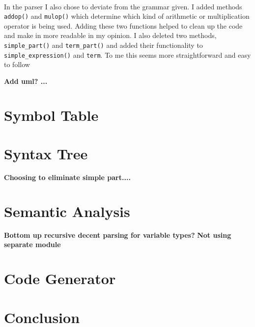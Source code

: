 \documentclass[10]{article}
\begin{document}
\paragraph{}
In the parser I also chose to deviate from the grammar given. I added methods \verb|addop()| and \verb|mulop()| which determine which kind of arithmetic or multiplication operator is being used. Adding these two functions helped to clean up the code and make in more readable in my opinion. I also deleted two methods, \verb|simple_part()| and \verb|term_part()| and added their functionality to \verb|simple_expression()| and \verb|term|. To me this seems more straightforward and easy to follow


\textbf{Add uml? ... }

\section{Symbol Table}

\section{Syntax Tree}

\textbf{Choosing to eliminate simple part....}

\section{Semantic Analysis}

\textbf{Bottom up recursive decent parsing for variable types?}
\textbf{Not using separate module}


\section{Code Generator}

\section{Conclusion}
\end{document}
